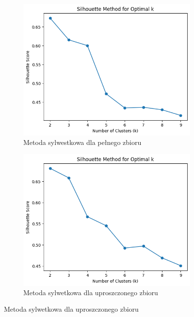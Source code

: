 \documentclass[polish,12pt,a4paper]{extarticle}
\begin{document}
\begin{figure}[h!]
    \centering
    \begin{subfigure}[b]{0.30\textwidth}
        \includegraphics[width=\linewidth]{img/silhouette_full.png}
        \captionsetup{labelformat=empty}
        \centering
        \caption{Metoda sylwestkowa dla pełnego zbioru}
    \end{subfigure}
    \hspace{}
    \begin{subfigure}[b]{0.30\textwidth}
        \includegraphics[width=\linewidth]{img/sillhouette_reduced.png}
        \captionsetup{labelformat=empty}
        \centering
        \caption{Metoda sylwetkowa dla uproszczonego zbioru}
    \end{subfigure}

    \label{fig:data_grid}
\end{figure} \FloatBarrier
\end{document}
